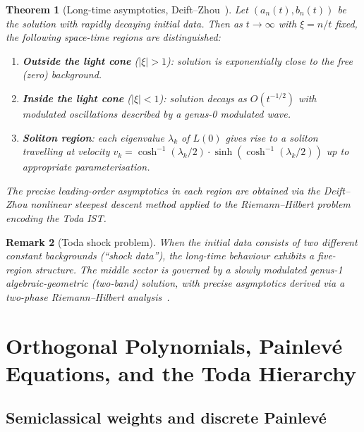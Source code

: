 \documentclass[12pt,a4paper]{article}
\newtheorem{theorem}{Theorem}[section]
\newtheorem{remark}[theorem]{Remark}
\theoremstyle{definition}
\begin{document}
\begin{theorem}[Long-time asymptotics, Deift--Zhou~\cite{DeiftZhou1993,Teschl2000,EgorovaRHP}]
Let $(a_n(t),b_n(t))$ be the solution with rapidly decaying initial data.
Then as $t\to\infty$ with $\xi = n/t$ fixed, the following space-time
regions are distinguished:
\begin{enumerate}[label=(\roman*)]
  \item \textbf{Outside the light cone} ($|\xi|>1$): solution is
        exponentially close to the free (zero) background.
  \item \textbf{Inside the light cone} ($|\xi|<1$): solution decays as
        $O(t^{-1/2})$ with modulated oscillations described by a genus-0
        modulated wave.
  \item \textbf{Soliton region}: each eigenvalue $\lambda_k$ of $L(0)$
        gives rise to a soliton travelling at velocity
        $v_k = \cosh^{-1}(\lambda_k/2)\cdot\sinh(\cosh^{-1}(\lambda_k/2))$
        up to appropriate parameterisation.
\end{enumerate}
The precise leading-order asymptotics in each region are obtained via the
\emph{Deift--Zhou nonlinear steepest descent method} applied to the
Riemann--Hilbert problem encoding the Toda IST.
\end{theorem}

\begin{remark}[Toda shock problem]
When the initial data consists of two different constant backgrounds
(``shock data''), the long-time behaviour exhibits a five-region structure.
The middle sector is governed by a slowly modulated genus-1
algebraic-geometric (two-band) solution, with precise asymptotics
derived via a two-phase Riemann--Hilbert analysis~\cite{EgorovaRHP}.
\end{remark}

\section{Orthogonal Polynomials, Painlev\'e Equations, and the Toda Hierarchy}

\subsection{Semiclassical weights and discrete Painlev\'e}
\end{document}

